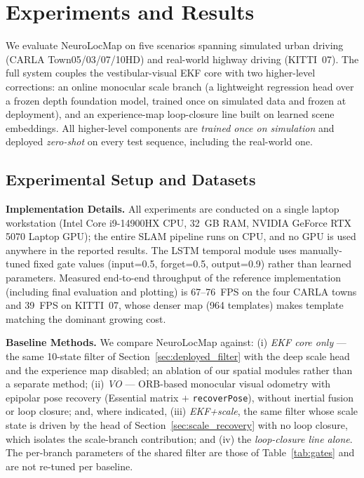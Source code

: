 
\section{Experiments and Results}
\label{sec:experiments}

We evaluate NeuroLocMap on five scenarios spanning simulated urban driving (CARLA Town05/03/07/10HD) and real-world highway driving (KITTI~07). The full system couples the vestibular-visual EKF core with two higher-level corrections: an online monocular scale branch (a lightweight regression head over a frozen depth foundation model, trained once on simulated data and frozen at deployment), and an experience-map loop-closure line built on learned scene embeddings. All higher-level components are \emph{trained once on simulation} and deployed \emph{zero-shot} on every test sequence, including the real-world one.

\subsection{Experimental Setup and Datasets}

\textbf{Implementation Details.} All experiments are conducted on a single laptop workstation (Intel Core i9-14900HX CPU, 32~GB RAM, NVIDIA GeForce RTX 5070 Laptop GPU); the entire SLAM pipeline runs on CPU, and no GPU is used anywhere in the reported results. The LSTM temporal module uses manually-tuned fixed gate values (input=0.5, forget=0.5, output=0.9) rather than learned parameters. Measured end-to-end throughput of the reference implementation (including final evaluation and plotting) is 67--76~FPS on the four CARLA towns and 39~FPS on KITTI~07, whose denser map (964 templates) makes template matching the dominant growing cost.

\textbf{Baseline Methods.} We compare NeuroLocMap against: (i) \emph{EKF core only} --- the same 10-state filter of Section~\ref{sec:deployed_filter} with the deep scale head and the experience map disabled; an ablation of our spatial modules rather than a separate method; (ii) \emph{VO} --- ORB-based monocular visual odometry with epipolar pose recovery (Essential matrix $+$ \texttt{recoverPose}), without inertial fusion or loop closure; and, where indicated, (iii) \emph{EKF+scale}, the same filter whose scale state is driven by the head of Section~\ref{sec:scale_recovery} with no loop closure, which isolates the scale-branch contribution; and (iv) the \emph{loop-closure line alone}. The per-branch parameters of the shared filter are those of Table~\ref{tab:gates} and are not re-tuned per baseline.

